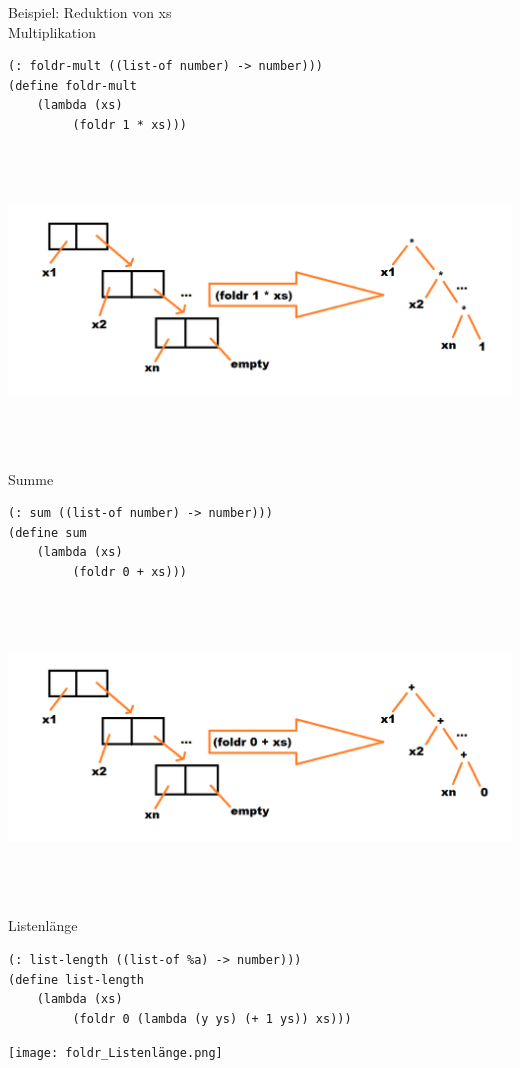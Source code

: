 \documentclass[paper=a4, fontsize=11pt]{scrartcl}
\numberwithin{equation}{section}
\numberwithin{figure}{section}
\numberwithin{table}{section}
\begin{document}
\begin{lstlistig}
Beispiel: Reduktion von xs \\
Multiplikation \\
\begin{lstlisting}
(: foldr-mult ((list-of number) -> number)))
(define foldr-mult
    (lambda (xs)
         (foldr 1 * xs)))
\end{lstlisting}
\includegraphics[width=15cm,height=8cm]{foldr_Multiplikation.png}

Summe \\
\begin{lstlisting}
(: sum ((list-of number) -> number)))
(define sum
    (lambda (xs)
         (foldr 0 + xs)))
\end{lstlisting}
\includegraphics[width=15cm,height=8cm]{foldr_Summe.png}

Listenlänge \\
\begin{lstlisting}
(: list-length ((list-of %a) -> number)))
(define list-length
    (lambda (xs)
         (foldr 0 (lambda (y ys) (+ 1 ys)) xs)))
\end{lstlisting}
\texttt{[image: foldr\_Listenlänge.png]}


\end{lstlistig}
\end{document}
